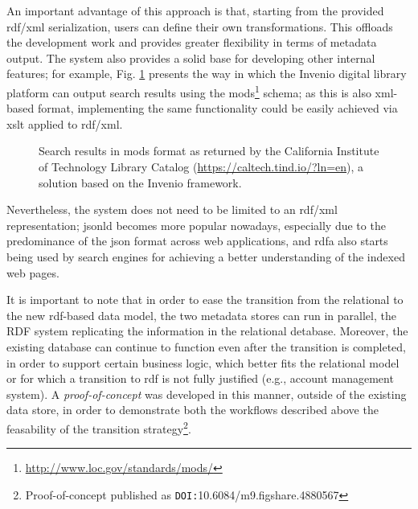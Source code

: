An important advantage of this approach is that, starting from the provided \gls{rdf}/\gls{xml} serialization, users can define their own transformations. This offloads the development work and provides greater flexibility in terms of metadata output. The system also provides a solid
base for developing other internal features; for example, Fig. \ref{fig:tind_search} presents the way in which the Invenio digital library platform can output search results using the \gls{mods}\footnote{\url{http://www.loc.gov/standards/mods/}} schema; as this is also \gls{xml}-based format, implementing the same functionality could be easily achieved via \gls{xslt} applied to \gls{rdf}/\gls{xml}.

\begin{figure}[t]
  \centering
  \caption{Search results in \gls{mods} format as returned by the California Institute of Technology Library Catalog (\url{https://caltech.tind.io/?ln=en}), a solution based on the Invenio framework.}
  \label{fig:tind_search}
\end{figure}

Nevertheless, the system does not need to be limited to an \gls{rdf}/\gls{xml} representation; \gls{jsonld} becomes more popular nowadays, especially due to the predominance of the \gls{json} format across web applications, and \gls{rdfa} also starts being used by search engines for achieving a better understanding of the indexed web pages\cite{googleld}.

It is important to note that in order to ease the transition from the relational to the new \gls{rdf}-based data model, the two metadata stores can run in parallel, the RDF system replicating the information in the relational detabase. Moreover, the existing database can continue to function even after the transition is completed, in order to support certain business logic, which better fits the relational model or for which a transition to \gls{rdf} is not fully justified (e.g., account management system). A \emph{proof-of-concept}  was developed in this manner, outside of the existing data store, in order to demonstrate both the workflows described above the feasability of the transition strategy\footnote{Proof-of-concept published as \texttt{DOI:}10.6084/m9.figshare.4880567}. 

